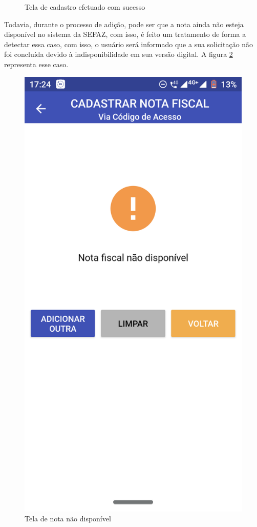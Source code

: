 \begin{figure}[h]
    \caption{Tela de cadastro efetuado com sucesso}
    \label{appQRCodeSucessoFig}
\end{figure}

\newpage
Todavia, durante o processo de adição, pode ser que a nota ainda não esteja disponível no sistema da SEFAZ, com isso, é feito um tratamento de forma a detectar essa caso, com isso, o usuário será informado que a sua solicitação não foi concluída devido à indisponibilidade em sua versão digital. A figura \ref{appQRCodeNaoDisponivelFig} representa esse caso.

\begin{figure}[h]
    \centering
    \includegraphics[scale=0.15]{tcc/figures/app/app_codigo_acesso_nao_disponivel.png}
    \caption{Tela de nota não disponível}
    \label{appQRCodeNaoDisponivelFig}
\end{figure}

